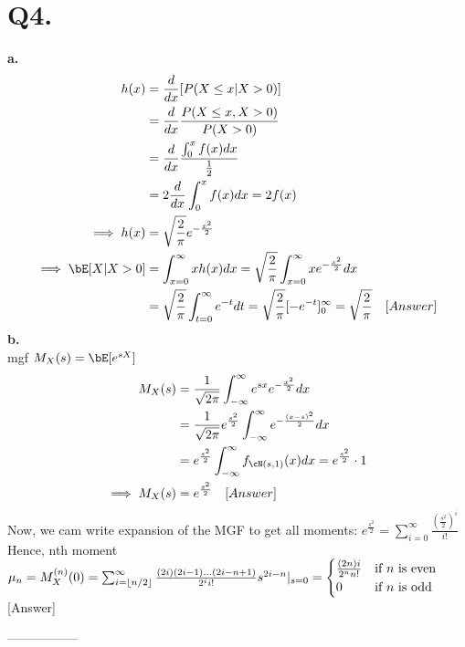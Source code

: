 \documentclass[a4paper,11pt]{article}
\begin{document}
\section*{Q4.}
\textbf{a.}\\
\begin{align*}
 h(x) &= \frac{d}{dx}[P(X\leq x | X > 0)]\\
 &= \frac{d}{dx} \frac{P(X\leq x, X > 0)}{P(X > 0)}\\
 &= \frac{d}{dx} \frac{\int_{0}^{x}f(x)dx}{\frac{1}{2}}\\
 &= 2\frac{d}{dx} \int_{0}^{x}f(x)dx = 2 f(x)\\
 \implies  h(x) &= \sqrt{\frac{2}{\pi}}e^{-\frac{x^2}{2}} \\
 \implies \bE[X  |X > 0] &= \int_{x=0}^{\infty}xh(x)dx = \sqrt{\frac{2}{\pi}}\int_{x=0}^{\infty}xe^{-\frac{x^2}{2}}dx \\
 &= \sqrt{\frac{2}{\pi}}\int_{t=0}^{\infty}e^{-t}dt = \sqrt{\frac{2}{\pi}}[-e^{-t}]_{0}^{\infty} = \sqrt{\frac{2}{\pi}} \hspace{10pt} [Answer]
\end{align*}
\textbf{b.}\\
mgf $M_X(s) = \bE[e^{sX}]$
\begin{align*}
 M_X(s) &= \frac{1}{\sqrt{2\pi}}\int_{-\infty}^{\infty}e^{sx}e^{-\frac{x^2}{2}}dx\\
 &=  \frac{1}{\sqrt{2\pi}}e^{\frac{s^2}{2}}\int_{-\infty}^{\infty}e^{-\frac{(x-s)^2}{2}}dx\\
 &= e^{\frac{s^2}{2}} \int_{-\infty}^{\infty} f_{\cN(s,1)}(x)dx = e^{\frac{s^2}{2}}\cdot 1\\
 \implies  M_X(s) &= e^{\frac{s^2}{2}} \hspace{10pt} [Answer]
\end{align*}
Now, we cam write expansion of the MGF to get all moments:
$e^{\frac{s^2}{2}} = \sum_{i=0}^{\infty}\frac{(\frac{s^2}{2})^i}{i!}$
Hence, nth moment $\mu_n = M_X^{(n)}(0) = \sum_{i=\left\lfloor n/2 \right\rfloor}^{\infty} \frac{(2i)(2i-1)...(2i - n + 1)}{2^ii!}s^{2i - n} |_{s=0} = \begin{cases}
                             \frac{(2n)i}{2^nn!} & \text{if $n$ is even}\\
                             0 &\text{if $n$ is odd}
                             \end{cases}$ [Answer]
\begin{center}
-----------------\\
\end{center}
\end{document}
